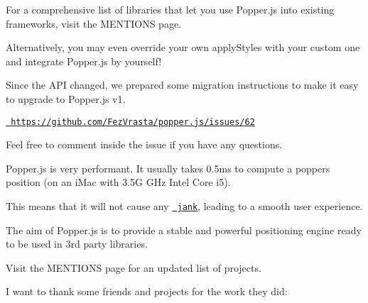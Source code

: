 For a comprehensive list of libraries that let you use Popper.\+js into existing frameworks, visit the M\+E\+N\+T\+I\+O\+NS page.

Alternatively, you may even override your own {\ttfamily apply\+Styles} with your custom one and integrate Popper.\+js by yourself!


\begin{DoxyCode}{0}
\DoxyCodeLine{\};}
\DoxyCodeLine{}
\DoxyCodeLine{        \},}
\DoxyCodeLine{    \},}
\DoxyCodeLine{\});}
\end{DoxyCode}


Since the A\+PI changed, we prepared some migration instructions to make it easy to upgrade to Popper.\+js v1.

\href{https://github.com/FezVrasta/popper.js/issues/62}{\texttt{ https\+://github.\+com/\+Fez\+Vrasta/popper.\+js/issues/62}}

Feel free to comment inside the issue if you have any questions.

Popper.\+js is very performant. It usually takes 0.\+5ms to compute a popper\textquotesingle{}s position (on an i\+Mac with 3.\+5G G\+Hz Intel Core i5).

This means that it will not cause any \href{https://www.chromium.org/developers/how-tos/trace-event-profiling-tool/anatomy-of-jank}{\texttt{ jank}}, leading to a smooth user experience.

The aim of Popper.\+js is to provide a stable and powerful positioning engine ready to be used in 3rd party libraries.

Visit the M\+E\+N\+T\+I\+O\+NS page for an updated list of projects.

I want to thank some friends and projects for the work they did\+:


